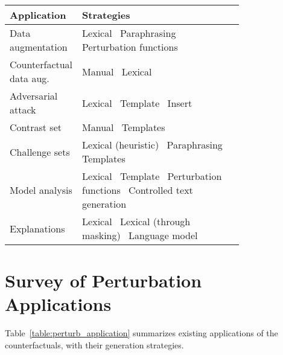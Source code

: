 \begin{table*}[t]
\small
\centering
\setlength{\tabcolsep}{3.5pt}
\begin{tabular}{@{}l p{0.77\linewidth}@{}}
\toprule
\textbf{Application} & \textbf{Strategies} \\ 
\midrule
Data augmentation & 
    Lexical~\cite{Wu2019ConditionalBC, Wei2019EDAED, Kumar2020DataAU}\newline
    Paraphrasing~\cite{iyyer2018adversarial} \newline
    Perturbation functions~\cite{ratner2017snorkel}
\\\midrule
Counterfactual data aug. & 
    Manual~\cite{kaushik2019learning}
    Lexical~\cite{garg2019counterfactual}
\\\midrule
Adversarial attack & 
    Lexical~\cite{alzantot2018generating, garg2020bae, li-etal-2020-bert-attack, morris2020textattack, tan2020s, jin2020bert, ebrahimi2017hotflip, Zhang2019GeneratingFA, Jia2019CertifiedRT} \newline
    Template~\cite{jiang2019avoiding}\newline
    Insert~\cite{Song2020UniversalAA}
\\\midrule
Contrast set & 
    Manual~\cite{gardner2020contrast} \newline
    Templates~\cite{li2020linguistically}
\\\midrule
Challenge sets  & 
    Lexical (heuristic)~\cite{kaushik2019learning, naik2018stress} \newline
    Paraphrasing~\cite{Kavumba2019WhenCP} \newline
    Templates~\cite{Geiger2019PosingFG, kaushik2019learning, nie2019analyzing, mccoy2019right}
\\\midrule
Model analysis & 
    Lexical~\cite{garg2019counterfactual}\newline
    Template~\cite{Goodwin2020ProbingLS}\newline
    Perturbation functions~\cite{wu2019errudite, bowman-etal-2015-large, checklist:acl20}\newline
    Controlled text generation~\cite{madaan2020generate}
\\\midrule
Explanations & 
    Lexical~\cite{hase2020evaluating, vig2020causal, kang2020counterfactual} \newline
    Lexical (through masking)~\cite{ramon2019counterfactual, ribeiro2018anchors}\newline
    Language model~\cite{ross2020explaining}
\\
\bottomrule
\end{tabular}
\vspace{-5pt}

\caption{A short survey on counterfactual application papers, and their generation strategies.}
\label{table:perturb_application}
\vspace{-10pt}

\end{table*}

\section{Survey of Perturbation Applications}
\label{appendix:paper_survey}

Table~\ref{table:perturb_application} summarizes existing applications of the counterfactuals, with their generation strategies.
